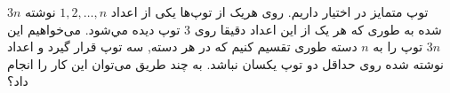     \p
    $3n$
     توپ متمایز در اختیار داریم. روی هریک از توپ‌ها یکی از اعداد 
    $1, 2, \dots, n$ نوشته شده به طوری که هر یک از این اعداد دقیقا روی $3$ توپ ديده مي‌شود. می‌خواهیم این 
    $3n$ توپ را به $n$ دسته طوری تقسیم کنیم که در هر دسته, سه توپ قرار گیرد و اعداد نوشته شده روی حداقل دو توپ یکسان نباشد. به چند طریق می‌توان این کار را انجام داد؟